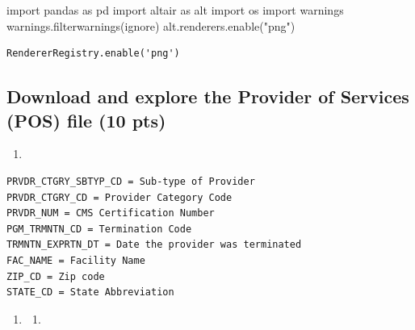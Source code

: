 \documentclass[
  letterpaper,
  DIV=11,
  numbers=noendperiod]{scrartcl}
\newenvironment{Shaded}{\begin{snugshade}}{\end{snugshade}}
\newcommand{\ImportTok}[1]{\textcolor[rgb]{0.00,0.46,0.62}{#1}}
\newcommand{\NormalTok}[1]{\textcolor[rgb]{0.00,0.23,0.31}{#1}}
\newcommand{\StringTok}[1]{\textcolor[rgb]{0.13,0.47,0.30}{#1}}
\providecommand{\tightlist}{%
  \setlength{\itemsep}{0pt}\setlength{\parskip}{0pt}}\usepackage{longtable,booktabs,array}
\begin{document}
\begin{Shaded}
\begin{Highlighting}[]
\ImportTok{import}\NormalTok{ pandas }\ImportTok{as}\NormalTok{ pd}
\ImportTok{import}\NormalTok{ altair }\ImportTok{as}\NormalTok{ alt}
\ImportTok{import}\NormalTok{ os}
\ImportTok{import}\NormalTok{ warnings}
\NormalTok{warnings.filterwarnings(}\StringTok{\textquotesingle{}ignore\textquotesingle{}}\NormalTok{)}
\NormalTok{alt.renderers.enable(}\StringTok{"png"}\NormalTok{)}
\end{Highlighting}
\end{Shaded}

\begin{verbatim}
RendererRegistry.enable('png')
\end{verbatim}

\subsection{Download and explore the Provider of Services (POS) file (10
pts)}\label{download-and-explore-the-provider-of-services-pos-file-10-pts}

\begin{enumerate}
\def\labelenumi{\arabic{enumi}.}
\tightlist
\item
\end{enumerate}

\begin{verbatim}
PRVDR_CTGRY_SBTYP_CD = Sub-type of Provider
PRVDR_CTGRY_CD = Provider Category Code
PRVDR_NUM = CMS Certification Number
PGM_TRMNTN_CD = Termination Code
TRMNTN_EXPRTN_DT = Date the provider was terminated 
FAC_NAME = Facility Name
ZIP_CD = Zip code
STATE_CD = State Abbreviation
\end{verbatim}

\begin{enumerate}
\def\labelenumi{\arabic{enumi}.}
\setcounter{enumi}{1}
\tightlist
\item
  \begin{enumerate}
  \def\labelenumii{\alph{enumii}.}
  \tightlist
  \item
  \end{enumerate}
\end{enumerate}
\end{document}
